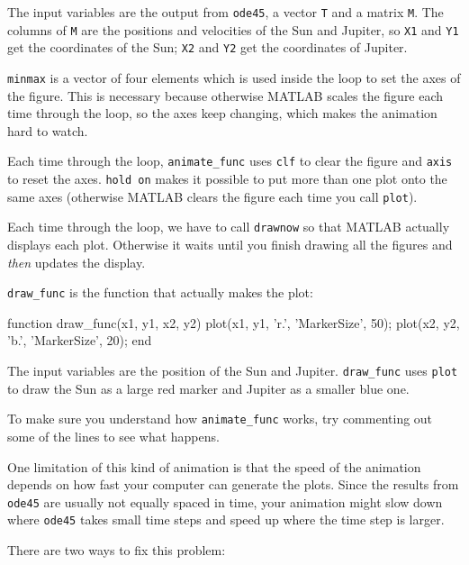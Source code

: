 \documentclass[
]{book}
\numberwithin{Answer}{chapter}
\numberwithin{Exercise}{chapter}
\begin{document}
The input variables are the output from {\tt ode45}, a vector
{\tt T} and a matrix {\tt M}.  The columns of {\tt M} are the
positions and velocities of the Sun and Jupiter, so
{\tt X1} and {\tt Y1} get the coordinates of the Sun;
{\tt X2} and {\tt Y2} get the coordinates of Jupiter.

{\tt minmax} is a vector of four elements which is used inside
the loop to set the axes of the figure.  This is necessary because
otherwise MATLAB scales the figure each time through the loop,
so the axes keep changing, which makes the animation hard
to watch.

Each time through the loop, {\tt animate\_func} uses {\tt clf}
to clear the figure and {\tt axis} to reset the axes.  {\tt hold
on} makes it possible to put more than one plot onto the same
axes (otherwise MATLAB clears the figure each time you call
{\tt plot}).

Each time through the loop, we have to call {\tt drawnow} so
that MATLAB actually displays each plot.  Otherwise it waits
until you finish drawing all the figures and {\em then} updates
the display.

{\tt draw\_func} is the function that actually makes the
plot:

\begin{code}
function draw_func(x1, y1, x2, y2)
    plot(x1, y1, 'r.', 'MarkerSize', 50);
    plot(x2, y2, 'b.', 'MarkerSize', 20);
end
\end{code}

The input variables are the position of the Sun and Jupiter.
{\tt draw\_func} uses {\tt plot} to draw
the Sun as a large red marker and Jupiter as a smaller blue one.

\begin{ex}
To make sure you understand how {\tt animate\_func} works,
try commenting out some of the lines to see what happens.
\end{ex}

One limitation of this kind of animation is that the speed
of the animation depends on how fast your computer can generate
the plots.  Since the results from {\tt ode45} are usually not
equally spaced in time, your animation might slow down where
{\tt ode45} takes small time steps and speed up where the time
step is larger.

There are two ways to fix this problem:
\end{document}
